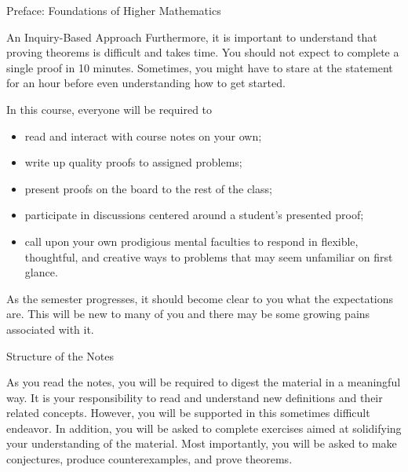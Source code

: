 \documentclass[11pt]{article}
\begin{document}
\begin{section}{Preface: Foundations of Higher Mathematics}
\begin{subsection}{An Inquiry-Based Approach}
Furthermore, it is important to understand that proving theorems is difficult and takes time. You should not expect to complete a single proof in 10 minutes. Sometimes, you might have to stare at the statement for an hour before even understanding how to get started. 

In this course, everyone will be required to

\begin{itemize}
\item read and interact with course notes on your own;
\item write up quality proofs to assigned problems;
\item present proofs on the board to the rest of the class;
\item participate in discussions centered around a student's presented proof;
\item call upon your own prodigious mental faculties to respond in flexible, thoughtful, and creative ways to problems that may seem unfamiliar on first glance.
\end{itemize}

\noindent As the semester progresses, it should become clear to you what the expectations are. This will be new to many of you and there may be some growing pains associated with it.

\end{subsection}

\begin{subsection}{Structure of the Notes}

As you read the notes, you will be required to digest the material in a meaningful way.  It is your responsibility to read and understand new definitions and their related concepts.  However, you will be supported in this sometimes difficult endeavor. In addition, you will be asked to complete exercises aimed at solidifying your understanding of the material.  Most importantly, you will be asked to make conjectures, produce counterexamples, and prove theorems.


\end{subsection}
\end{section}
\end{document}
